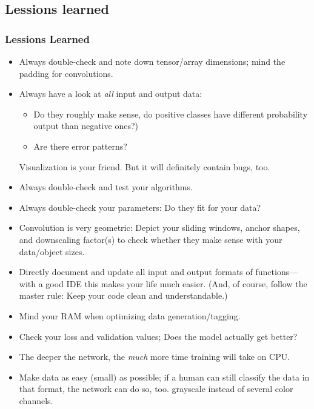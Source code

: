 \subsection{Lessions learned}
\begin{frame}[allowframebreaks]
  \frametitle<presentation>{Lessions Learned}
  \begin{itemize}[<.->]
  \item Always double-check and note down tensor/array dimensions;
    mind the padding for convolutions.
  \item Always have a look at \emph{all} input and output data:
    \begin{itemize}
    \item Do they roughly make sense, \forexample do positive classes have
      different probability output than negative ones?)
    \item Are there error patterns?
    \end{itemize}
    Visualization is your friend. But it will definitely contain bugs, too.
  \item Always double-check and test your algorithms.
  \item Always double-check your parameters: Do they fit for your data?
  \item Convolution is very geometric: Depict your sliding windows,
    anchor shapes, and downscaling factor(s) to check whether they
    make sense with your data/object sizes.
  \item Directly document and update all input and output formats of
    functions---with a good IDE this makes your life much easier.
    (And, of course, follow the master rule: Keep your code clean and
    understandable.)
  \item Mind your RAM when optimizing data generation/tagging.
  \item Check your loss and validation values; Does the model actually
    get better?
  \item The deeper the network, the \emph{much} more time training
    will take on CPU.
  \item Make data as easy (small) as possible; if a human can still
    classify the data in that format, the network can do so, too.
    \Forexample grayscale instead of several color channels.
  \end{itemize}
\end{frame}

\nocite{*}
\printbibliography



